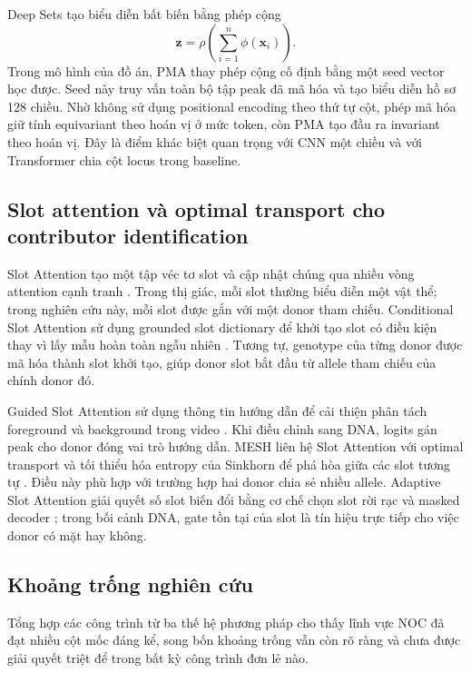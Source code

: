 \documentclass[12pt,a4paper]{article}
\begin{document}
Deep Sets tạo biểu diễn bất biến bằng phép cộng
\begin{equation}
\bm{z}=\rho\left(\sum_{i=1}^{n}\phi(\bm{x}_i)\right).
\end{equation}
Trong mô hình của đồ án, PMA thay phép cộng cố định bằng một seed vector học được. Seed này truy vấn toàn bộ tập peak đã mã hóa và tạo biểu diễn hồ sơ 128 chiều. Nhờ không sử dụng positional encoding theo thứ tự cột, phép mã hóa giữ tính equivariant theo hoán vị ở mức token, còn PMA tạo đầu ra invariant theo hoán vị. Đây là điểm khác biệt quan trọng với CNN một chiều và với Transformer chia cột locus trong baseline.

\subsection{Slot attention và optimal transport cho contributor identification}

Slot Attention tạo một tập véc tơ slot và cập nhật chúng qua nhiều vòng attention cạnh tranh \cite{locatello2020slot}. Trong thị giác, mỗi slot thường biểu diễn một vật thể; trong nghiên cứu này, mỗi slot được gắn với một donor tham chiếu. Conditional Slot Attention sử dụng grounded slot dictionary để khởi tạo slot có điều kiện thay vì lấy mẫu hoàn toàn ngẫu nhiên \cite{ma2024cosa}. Tương tự, genotype của từng donor được mã hóa thành slot khởi tạo, giúp donor slot bắt đầu từ allele tham chiếu của chính donor đó.

Guided Slot Attention sử dụng thông tin hướng dẫn để cải thiện phân tách foreground và background trong video \cite{lee2024gsa}. Khi điều chỉnh sang DNA, logits gán peak cho donor đóng vai trò hướng dẫn. MESH liên hệ Slot Attention với optimal transport và tối thiểu hóa entropy của Sinkhorn để phá hòa giữa các slot tương tự \cite{zhang2023mesh}. Điều này phù hợp với trường hợp hai donor chia sẻ nhiều allele. Adaptive Slot Attention giải quyết số slot biến đổi bằng cơ chế chọn slot rời rạc và masked decoder \cite{fan2024adaslot}; trong bối cảnh DNA, gate tồn tại của slot là tín hiệu trực tiếp cho việc donor có mặt hay không.

\subsection{Khoảng trống nghiên cứu}
\label{sec:gap}

Tổng hợp các công trình từ ba thế hệ phương pháp cho thấy lĩnh vực NOC đã đạt nhiều cột mốc đáng kể, song bốn khoảng trống vẫn còn rõ ràng và chưa được giải quyết triệt để trong bất kỳ công trình đơn lẻ nào.
\end{document}

